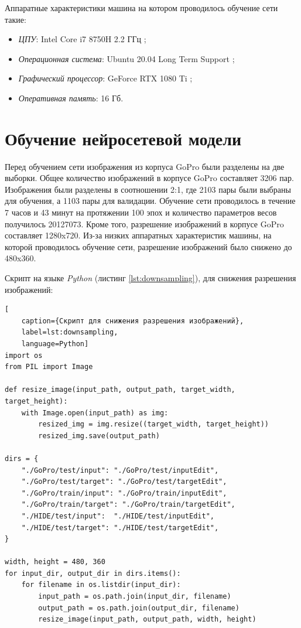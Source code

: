Аппаратные характеристики машина на котором проводилось обучение сети такие:

\begin{itemize}
    \item \textit{ЦПУ}: Intel Core i7 8750H 2.2 ГГц \cite{intel_core_i7_8750h};
    \item \textit{Операционная система}: Ubuntu 20.04 Long Term Support \cite{ubuntu2004};
    \item \textit{Графический процессор}: GeForce RTX 1080 Ti \cite{geforce_gtx_1080_ti};
    \item \textit{Оперативная память}: 16 Гб.
\end{itemize}

\section{Обучение нейросетевой модели}

Перед обучением сети изображения из корпуса GoPro \cite{nah2017deep} были разделены на две выборки. Общее количество изображений в корпусе GoPro составляет 3206 пар. Изображения были разделены в соотношении 2:1, где 2103 пары были выбраны для обучения, а 1103 пары для валидации. Обучение сети проводилось в течение 7 часов и 43 минут на протяжении 100 эпох и количество параметров весов получилось 20127073. Кроме того, разрешение изображений в корпусе GoPro составляет 1280x720. Из-за низких аппаратных характеристик машины, на которой проводилось обучение сети, разрешение изображений было снижено до 480x360.

Скрипт на языке \textit{Python} (листинг \ref{lst:downsampling}), для снижения разрешения изображений:
\begin{lstlisting}[
	caption={Скрипт для снижения разрешения изображений},
	label=lst:downsampling,
	language=Python]
import os
from PIL import Image

def resize_image(input_path, output_path, target_width, target_height):
    with Image.open(input_path) as img:
        resized_img = img.resize((target_width, target_height))
        resized_img.save(output_path)

dirs = {
    "./GoPro/test/input": "./GoPro/test/inputEdit",
    "./GoPro/test/target": "./GoPro/test/targetEdit",
    "./GoPro/train/input": "./GoPro/train/inputEdit",
    "./GoPro/train/target": "./GoPro/train/targetEdit",
    "./HIDE/test/input":  "./HIDE/test/inputEdit",
    "./HIDE/test/target": "./HIDE/test/targetEdit",
}

width, height = 480, 360
for input_dir, output_dir in dirs.items():
    for filename in os.listdir(input_dir):
        input_path = os.path.join(input_dir, filename)
        output_path = os.path.join(output_dir, filename)
        resize_image(input_path, output_path, width, height)
\end{lstlisting}

